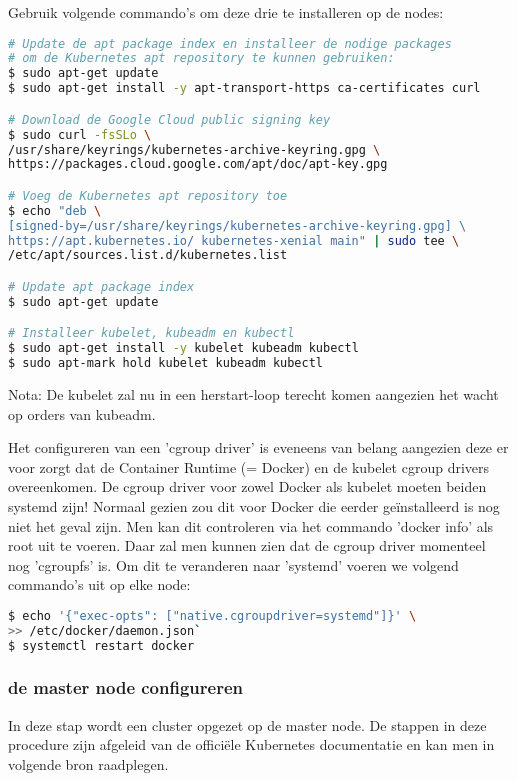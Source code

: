Gebruik volgende commando's om deze drie te installeren op de nodes:
\begin{lstlisting}[language=bash]
# Update de apt package index en installeer de nodige packages 
# om de Kubernetes apt repository te kunnen gebruiken:
$ sudo apt-get update
$ sudo apt-get install -y apt-transport-https ca-certificates curl

# Download de Google Cloud public signing key
$ sudo curl -fsSLo \
/usr/share/keyrings/kubernetes-archive-keyring.gpg \ 
https://packages.cloud.google.com/apt/doc/apt-key.gpg

# Voeg de Kubernetes apt repository toe 
$ echo "deb \
[signed-by=/usr/share/keyrings/kubernetes-archive-keyring.gpg] \ 
https://apt.kubernetes.io/ kubernetes-xenial main" | sudo tee \
/etc/apt/sources.list.d/kubernetes.list

# Update apt package index 
$ sudo apt-get update

# Installeer kubelet, kubeadm en kubectl
$ sudo apt-get install -y kubelet kubeadm kubectl
$ sudo apt-mark hold kubelet kubeadm kubectl

\end{lstlisting}

Nota: De kubelet zal nu in een herstart-loop terecht komen aangezien het wacht op orders van kubeadm.

Het configureren van een 'cgroup driver' is eveneens van belang aangezien deze er voor zorgt dat de Container Runtime (= Docker) en de kubelet cgroup drivers overeenkomen. De cgroup driver voor zowel Docker als kubelet moeten beiden systemd zijn! 
Normaal gezien zou dit voor Docker die eerder geïnstalleerd is nog niet het geval zijn. Men kan dit controleren via het commando 'docker info' als root uit te voeren. Daar zal men kunnen zien dat de cgroup driver momenteel nog 'cgroupfs' is. Om dit te veranderen naar 'systemd' voeren we volgend commando's uit op elke node: 
\begin{lstlisting}[language=bash]
$ echo '{"exec-opts": ["native.cgroupdriver=systemd"]}' \ 
>> /etc/docker/daemon.json`
$ systemctl restart docker
\end{lstlisting}

\subsubsection{de master node configureren}

In deze stap wordt een cluster opgezet op de master node. De stappen in deze procedure zijn afgeleid van de officiële Kubernetes documentatie en kan men in volgende bron raadplegen. \autocite{Kubernetes2022b}

